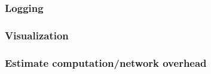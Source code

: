 \documentclass[11pt]{article}
\begin{document}
	\subsubsection*{Logging}
	
	\subsubsection*{Visualization}
	
	\subsubsection*{Estimate computation/network overhead}

\end{document}
